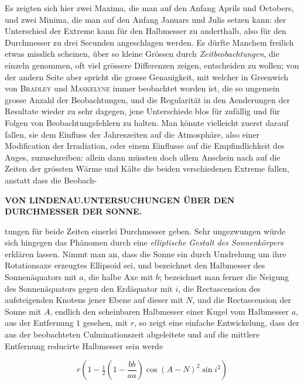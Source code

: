 Es zeigten sich hier zwei Maxima, die man auf den Anfang Aprils und Octobers, und zwei Minima, die man auf den Anfang Januars und Julis setzen kann: der Unterschied der Extreme kann für den Halbmesser zu anderthalb, also für den Durchmesser zu drei Secunden angeschlagen werden. Es dürfte Manchem freilich etwas misslich scheinen, über so kleine Grössen durch \emph{Zeitbeobachtungen}, die einzeln genommen, oft viel grössere Differenzen zeigen, entscheiden zu wollen; von der andern Seite aber spricht die grosse Genauigkeit, mit welcher in Greenwich von \textsc{Bradley} und \textsc{Maskelyne} immer beobachtet worden ist, die so ungemein grosse Anzahl der Beobachtungen, und die Regularität in den Aenderungen der Resultate wieder zu sehr dagegen, jene Unterschiede blos für zufällig und für Folgen von Beobachtungsfehlern zu halten. Man könnte vielleicht zuerst darauf fallen, sie dem Einfluss der Jahreszeiten auf die Atmosphäre, also einer Modification der Irradiation, oder einem Einflusse auf die Empfindlichkeit des Auges, zuzuschreiben: allein dann müssten doch allem Anschein nach auf die Zeiten der grössten Wärme und Kälte die beiden verschiedenen Extreme fallen, anstatt dass die Beobach-\par
\clearpage
\noindent{}%
\makebox[12mm][l]{}%
\parbox[t]{\dimexpr\linewidth-24mm\relax}{\centering\footnotesize\bfseries VON LINDENAU.\enspace UNTERSUCHUNGEN ÜBER DEN DURCHMESSER DER SONNE.\par}%
\par\nobreak\medskip
\noindent tungen für beide Zeiten einerlei Durchmesser geben. Sehr ungezwungen würde sich hingegen das Phänomen durch eine \emph{elliptische Gestalt des Sonnenkörpers} erklären lassen. Nimmt man an, dass die Sonne ein durch Umdrehung um ihre Rotationsaxe erzeugtes Ellipsoid sei, und bezeichnet den Halbmesser des Sonnenäquators mit $a$, die halbe Axe mit $b$; bezeichnet man ferner die Neigung des Sonnenäquators gegen den Erdäquator mit $i$, die Rectascension des aufsteigenden Knotens jener Ebene auf dieser mit $N$, und die Rectascension der Sonne mit $A$, endlich den scheinbaren Halbmesser einer Kugel vom Halbmesser $a$, aus der Entfernung $1$ gesehen, mit $r$, so zeigt eine einfache Entwickelung, dass der aus der beobachteten Culminationszeit abgeleitete und auf die mittlere Entfernung reducirte Halbmesser sein werde

\[ r\left(1-\tfrac{1}{2}\left(1-\frac{bb}{aa}\right)\cos(A-N)^2\sin i^2\right) \]


